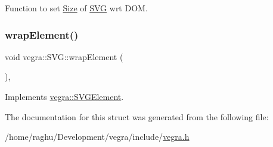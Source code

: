 Function to set \mbox{\hyperlink{structvegra_1_1Size}{Size}} of \mbox{\hyperlink{structvegra_1_1SVG}{S\+VG}} wrt D\+OM. 

\mbox{\label{structvegra_1_1SVG_ae7192d00544cf372f5dfed2b2436c973}} 
\subsubsection{\texorpdfstring{wrap\+Element()}{wrapElement()}}
{\footnotesize\ttfamily void vegra\+::\+S\+V\+G\+::wrap\+Element (\begin{DoxyParamCaption}{ }\end{DoxyParamCaption})\hspace{0.3cm}{\ttfamily [inline]}, {\ttfamily [virtual]}}



Implements \mbox{\hyperlink{structvegra_1_1SVGElement_a1369400ebe57287f1b5beb5f0234d8d7}{vegra\+::\+S\+V\+G\+Element}}.



The documentation for this struct was generated from the following file\+:\begin{DoxyCompactItemize}
\item 
/home/raghu/\+Development/vegra/include/\mbox{\hyperlink{vegra_8h}{vegra.\+h}}\end{DoxyCompactItemize}
